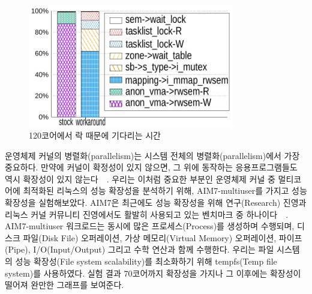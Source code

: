 \begin{figure}[h]
    \centering
    \includegraphics[width=0.8\textwidth]{graph/lockstat}
    \caption{120코어에서 락 때문에 기다리는 시간}
  \label{fig:aim7_default}
\end{figure}



운영체제 커널의 병렬화(parallelism)는 시스템 전체의 병렬화(parallelism)에서 가장 중요하다. 
만약에 커널이 확정성이 있지 않으면, 그 위에 동작하는 응용프로그램들도 역시 확장성이 있지
 않는다~\cite{Clements15SCR}~\cite{Boyd-WickizerCorey}.
우리는 이처럼 중요한 부분인 운영체제 커널 중 멀티코어에 최적화된 리눅스의 성능 확장성을 분석하기 위해, 
AIM7-multiuser를 가지고 성능 확장성을 실험해보았다.
AIM7은 최근에도 성능 확장성을 위해 연구(Research) 진영과 리눅스 커널 커뮤니티 진영에서도 활발히
 사용되고 있는 벤치마크 중 하나이다~\cite{Bueso2015STP}~\cite{Bueso2014MCS}.
AIM7-multiuser 워크로드는 동시에 많은 프로세스(Process)를 생성하며 수행되며, 디스크 파일(Disk File) 오퍼레이션,
 가상 메모리(Virtual Memory) 오퍼레이션, 파이프(Pipe), I/O(Input/Output) 그리고 수학 연산과 함께 수행한다.
우리는 파일 시스템의 성능 확장성(File system scalability)를 최소화하기 위해 
tempfs(Temp file system)를 사용하였다.
실험 결과 70코어까지 확장성을 가지나 그 이후에는 확장성이 떨어져 완만한 그래프를 보여준다. 


